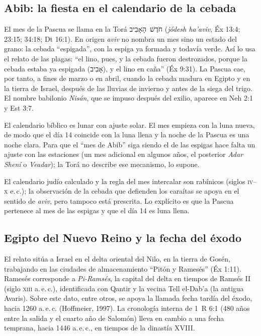 \documentclass[11pt,letterpaper]{article}
\newcommand{\heb}[1]{\mbox{\foreignlanguage{hebrew}{#1}}}
\begin{document}
\subsection{Abib: la fiesta en el calendario de la cebada}
El mes de la Pascua se llama en la Torá \heb{חֹדֶשׁ הָאָבִיב} (\emph{jódesh ha'aviv}, Éx 13:4; 23:15; 34:18; Dt 16:1). En origen \emph{aviv} no nombra un mes sino un estado del grano: la cebada ``espigada'', con la espiga ya formada y todavía verde. Así lo usa el relato de las plagas: ``el lino, pues, y la cebada fueron destrozados, porque la cebada estaba ya espigada (\heb{אָבִיב}), y el lino en caña'' (Éx 9:31). La Pascua cae, por tanto, a fines de marzo o en abril, cuando la cebada madura en Egipto y en la tierra de Israel, después de las lluvias de invierno y antes de la siega del trigo. El nombre babilonio \emph{Nisán}, que se impuso después del exilio, aparece en Neh 2:1 y Est 3:7.

El calendario bíblico es lunar con ajuste solar. El mes empieza con la luna nueva, de modo que el día 14 coincide con la luna llena y la noche de la Pascua es una noche clara. Para que el ``mes de Abib'' siga siendo el de las espigas hace falta un ajuste con las estaciones (un mes adicional en algunos años, el posterior \emph{Adar Shení} o \emph{Veadar}); la Torá no describe ese mecanismo, lo supone.

\begin{nota}[Precisión]
El calendario judío calculado y la regla del mes intercalar son rabínicos (siglos \textsc{iv}--\textsc{x} e.\,c.); la observación de la cebada que defienden los caraítas se apoya en el sentido de \emph{aviv}, pero tampoco está prescrita. Lo explícito es que la Pascua pertenece al mes de las espigas y que el día 14 es luna llena.
\end{nota}

\subsection{Egipto del Nuevo Reino y la fecha del éxodo}
El relato sitúa a Israel en el delta oriental del Nilo, en la tierra de Gosén, trabajando en las ciudades de almacenamiento ``Pitón y Ramesés'' (Éx 1:11). Ramesés corresponde a \emph{Pi-Ramsés}, la capital del delta en tiempos de Ramsés II (siglo \textsc{xiii} a.\,e.\,c.), identificada con Qantir y la vecina Tell el-Dab'a (la antigua Avaris). Sobre este dato, entre otros, se apoya la llamada fecha tardía del éxodo, hacia 1260 a.\,e.\,c. (Hoffmeier, 1997). La cronología interna de 1~R 6:1 (480 años entre la salida y el cuarto año de Salomón) lleva en cambio a una fecha temprana, hacia 1446 a.\,e.\,c., en tiempos de la dinastía XVIII.
\end{document}
